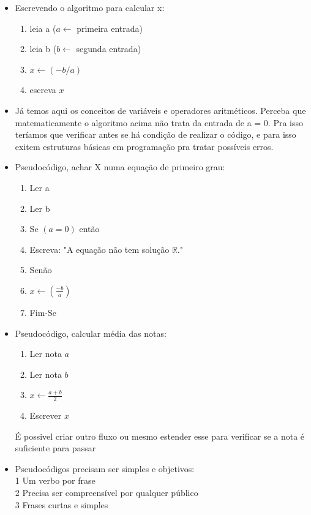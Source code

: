 \documentclass[12pt,a4paper]{article} %
\begin{document}
\begin{itemize}
\begin{itemize}
					\end{itemize}
				\item Escrevendo o algoritmo para calcular x:
					\begin{enumerate}
						\item leia a ($a \leftarrow$ primeira entrada)
						\item leia b ($b \leftarrow$ segunda entrada)
						\item $x \leftarrow (-b/a)$
						\item escreva $x$
					\end{enumerate}
				\item Já temos aqui os conceitos de variáveis e operadores aritméticos. Perceba que matematicamente o algoritmo acima não trata da entrada de a = 0. Pra isso teríamos que verificar antes se há condição de realizar o código, e para isso exitem estruturas básicas em programação pra tratar possíveis erros.
				\item Pseudocódigo, achar X numa equação de primeiro grau:
					\begin{enumerate}
						\item Ler a
						\item Ler b
						\item Se $(a=0)$ então
						\item \tabto{1.1cm}Escreva: "A equação não tem solução $\mathbb{R}$."
						\item Senão
						\item \tabto{1.1cm}$x \leftarrow (\frac{-b}{a})$
						\item Fim-Se
					\end{enumerate}
				\item Pseudocódigo, calcular média das notas:
					\begin{enumerate}
						\item Ler nota $a$
						\item Ler nota $b$
						\item $x \leftarrow \frac{a+b}{2}$
						\item Escrever $x$
					\end{enumerate}
				É possivel criar outro fluxo ou mesmo estender esse para verificar se a nota é suficiente para passar
				\item Pseudocódigos precisam ser simples e objetivos:\\
				1 Um verbo por frase\\
				2 Precisa ser compreensível por qualquer público\\
				3 Frases curtas e simples\\

\end{itemize}
\end{document}
